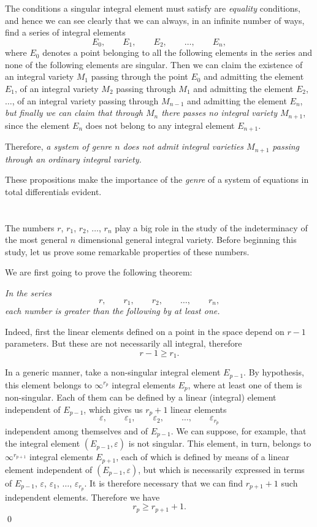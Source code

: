 \documentclass[leqno,11pt]{book}
\makeatletter
\theoremstyle{shape1}
\theoremstyle{shapesmall}
\let\old@epsilon\epsilon
\let\old@varepsilon\varepsilon
\let\epsilon\old@varepsilon
\let\varepsilon\old@epsilon
\newcommand{\somespace}{\vspace{9pt}}
\makeatother
\begin{document}
The conditions a singular integral element must satisfy are \emph{equality} conditions, and hence we can see clearly that we can always, in an infinite number of ways, find a series of integral elements 
\[
E_{0},\qquad E_{1},\qquad E_{2},\qquad \dots,\qquad E_{n},
\]
where $E_{0}$ denotes a point belonging to all the following elements in the series and none of the following elements are singular. Then we can claim the existence of an integral variety $M_{1}$ passing through the point $E_{0}$ and admitting the element $E_{1}$, of an integral variety $M_{2}$ passing through $M_{1}$ and admitting the element $E_{2}$, $\dots$, of an integral variety passing through $M_{n-1}$ and admitting the element $E_{n}$, \emph{but finally we can claim that through $M_{n}$ there passes no integral variety $M_{n+1}$}, since the element $E_{n}$ does not belong to any integral element $E_{n+1}$.

Therefore, \emph{a system of genre $n$ does not admit integral varieties $M_{n+1}$ passing through an ordinary integral variety.}

These propositions make the importance of the \emph{genre} of a system of equations in total differentials evident.

\section{}
\label{sec:5}

The numbers $r$, $r_{1}$, $r_{2}$, $\dots$, $r_{n}$ play a big role in the study of the indeterminacy of the most general $n$ dimensional general integral variety. Before beginning this study, let us prove some remarkable properties of these numbers.

We are first going to prove the following theorem:

\somespace

\emph{In the series}
\[
r,\qquad r_{1},\qquad r_{2},\qquad\dots,\qquad r_{n},
\]
\emph{each number is greater than the following by at least one.}

\somespace

Indeed, first the linear elements defined on a point in the space depend on $r-1$ parameters. But these are not necessarily all integral, therefore
\[
r-1\ge r_{1}.
\]

In a generic manner, take a non-singular integral element $E_{p-1}$. By hypothesis, this element belongs to $\infty^{r_{p}}$ integral elements $E_{p}$, where at least one of them is non-singular. Each of them can be defined by a linear (integral) element independent of $E_{p-1}$, which gives us $r_{p}+1$ linear elements
\[
\epsilon, \qquad\epsilon_{1},\qquad\epsilon_{2},\qquad\dots,\qquad\epsilon_{r_{p}}
\]
independent among themselves and of $E_{p-1}$. We can suppose, for example, that the integral element $(E_{p-1},\epsilon)$ is not singular. This element, in turn, belongs to $\infty^{r_{p+1}}$ integral elements $E_{p+1}$, each of which is defined by means of a linear element independent of $(E_{p-1},\epsilon)$, but which is necessarily expressed in terms of $E_{p-1}$, $\epsilon$, $\epsilon_{1}$, $\dots$, $\epsilon_{r_{p}}$. It is therefore necessary that we can find $r_{p+1}+1$ such independent elements. Therefore we have
\[
r_{p}\ge r_{p+1}+1.
\]
\qed
\end{document}
